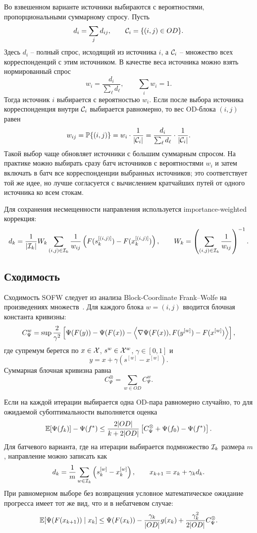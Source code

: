 Во взвешенном варианте источники выбираются с вероятностями, пропорциональными суммарному спросу.
Пусть
\[
    d_i=\sum_j d_{ij},
    \qquad
    \mathcal{C}_i=\{(i,j)\in OD\}.
\]
Здесь $d_i$ -- полный спрос, исходящий из источника $i$, а $\mathcal{C}_i$ -- множество всех
корреспонденций с этим источником.
В качестве веса источника можно взять нормированный спрос
\[
    w_i
    =
    \frac{d_i}{\sum_{\ell}d_\ell},
    \qquad
    \sum_i w_i=1.
\]
Тогда источник $i$ выбирается с вероятностью $w_i$.
Если после выбора источника корреспонденция внутри $\mathcal{C}_i$ выбирается равномерно, то
вес OD-блока $(i,j)$ равен
\[
    w_{ij}
    =
    \mathbb{P}\{(i,j)\}
    =
    w_i
    \cdot
    \frac{1}{|\mathcal{C}_i|}
    =
    \frac{d_i}{\sum_{\ell}d_\ell}
    \cdot
    \frac{1}{|\mathcal{C}_i|}.
\]
Такой выбор чаще обновляет источники с большим суммарным спросом.
На практике можно выбирать сразу батч источников с вероятностями $w_i$ и затем включать
в батч все корреспонденции выбранных источников; это соответствует той же идее, но лучше
согласуется с вычислением кратчайших путей от одного источника ко всем стокам.

Для сохранения несмещенности направления используется importance-weighted коррекция:
\[
    d_k
    =
    \frac{1}{|\mathcal{I}_k|}
    W_k
    \sum_{(i,j)\in\mathcal{I}_k}
    \frac{1}{w_{ij}}
    \left(
        F(s_k^{[(i,j)]})-F(x_k^{[(i,j)]})
    \right),
    \qquad
    W_k=
    \left(
        \sum_{(i,j)\in\mathcal{I}_k}\frac{1}{w_{ij}}
    \right)^{-1}.
\]

\subsection{Сходимость}

Сходимость SOFW следует из анализа Block-Coordinate Frank--Wolfe на произведениях множеств~\cite{lacoste2013block,jaggi2012blockcoordfw}.
Для каждого блока $w=(i,j)$ вводится блочная константа кривизны:
\[
C_\Psi^w
=
\sup
\frac{2}{\gamma^2}
\left[
    \Psi(F(y))
    -
    \Psi(F(x))
    -
    \left\langle \nabla\Psi(F(x)), F(y^{[w]})-F(x^{[w]}) \right\rangle
\right],
\]
где супремум берется по $x\in\mathcal{X}$, $s^w\in\mathcal{X}^w$, $\gamma\in[0,1]$ и
\[
    y=x+\gamma(s^{[w]}-x^{[w]}).
\]
Суммарная блочная кривизна равна
\[
    C_\Psi^\otimes=\sum_{w\in OD}C_\Psi^w.
\]

Если на каждой итерации выбирается одна OD-пара равномерно случайно, то для ожидаемой субоптимальности выполняется оценка
\begin{equation}
    \mathbb{E}[\Psi(f_k)]-\Psi(f^\ast)
    \leq
    \frac{2|OD|}{k+2|OD|}
    \left[
        C_\Psi^\otimes+\Psi(f_0)-\Psi(f^\ast)
    \right].
    \label{eq:sofw-rate-single}
\end{equation}
Для батчевого варианта, где на итерации выбирается подмножество $\mathcal{I}_k$ размера $m$, направление можно записать как
\[
    d_k=
    \frac{1}{m}
    \sum_{w\in\mathcal{I}_k}
    \left(s_k^{[w]}-x_k^{[w]}\right),
    \qquad
    x_{k+1}=x_k+\gamma_kd_k.
\]
При равномерном выборе без возвращения условное математическое ожидание прогресса имеет тот же вид, что и в небатчевом случае:
\[
    \mathbb{E}[\Psi(F(x_{k+1}))\mid x_k]
    \leq
    \Psi(F(x_k))
    -
    \frac{\gamma_k}{|OD|}g(x_k)
    +
    \frac{\gamma_k^2}{2|OD|}C_\Psi^\otimes.
\]

